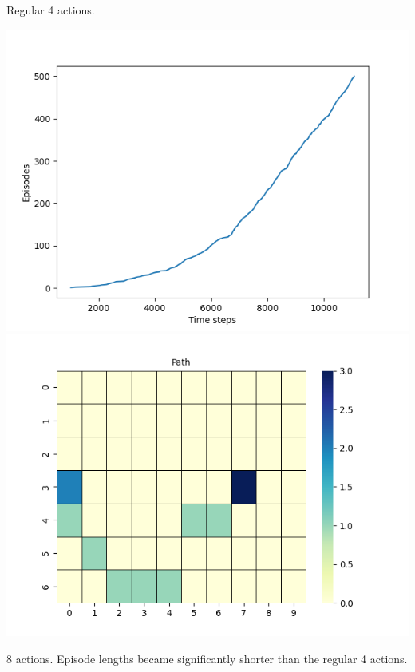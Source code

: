 \documentclass[11pt]{article}
\begin{document}
    Regular 4 actions.

    \includegraphics[scale=0.4]{figure_6_3_ex_6_9_a}
    \includegraphics[scale=0.4]{figure_6_3_ex_6_9_a_grid}

    8 actions.
    Episode lengths became significantly shorter than the regular 4 actions.
\end{document}

